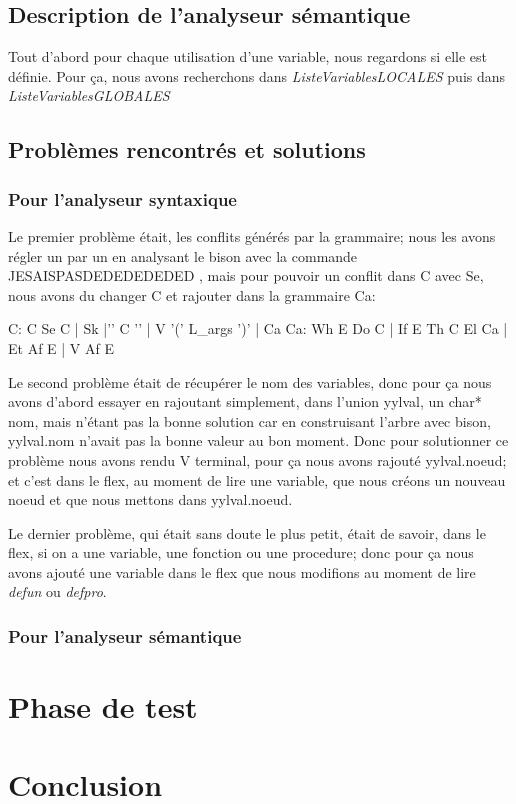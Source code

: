 \documentclass[10pt,a4paper]{article}
\begin{document}
\subsection{Description de l'analyseur sémantique}
Tout d'abord pour chaque utilisation d'une variable, nous regardons si elle est définie. Pour ça, nous avons recherchons dans \textit{ListeVariablesLOCALES} puis dans \textit{ListeVariablesGLOBALES} 

\subsection{Problèmes rencontrés et solutions}
\subsubsection {Pour l'analyseur syntaxique}
Le premier problème était, les conflits générés par la grammaire; nous les avons régler un par un en analysant le bison avec la commande JESAISPASDEDEDEDEDED , mais pour pouvoir un conflit dans C avec Se, nous avons du changer C et rajouter dans la grammaire Ca: 

C: C Se C
	| Sk
	|'{' C '}'
	| V '(' L_args ')'
	| Ca
Ca: Wh E Do C
	| If E Th C El Ca
	| Et Af E
	| V Af E

Le second problème était de récupérer le nom des variables, donc pour ça nous avons d'abord essayer en rajoutant simplement, dans l'union yylval, un char* nom, mais n'étant pas la bonne solution car en construisant l'arbre avec bison, yylval.nom n'avait pas la bonne valeur au bon moment. Donc pour solutionner ce problème nous avons rendu V terminal, pour ça nous avons rajouté yylval.noeud; et c'est dans le flex, au moment de lire une variable, que nous créons un nouveau noeud et que nous mettons dans yylval.noeud.

Le dernier problème, qui était sans doute le plus petit, était de savoir, dans le flex, si on a une variable, une fonction ou une procedure; donc pour ça nous avons ajouté une variable dans le flex que nous modifions au moment de lire \textit{defun} ou \textit{defpro}.
\subsubsection {Pour l'analyseur sémantique}


\section{Phase de test}


\newpage
\section{Conclusion}
\end{document}
